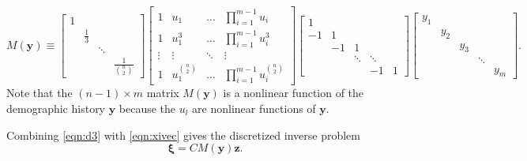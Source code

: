 \documentclass[11pt]{article}
\begin{document}
\begin{equation}
\label{eqn:M}
M(\boldsymbol y) \equiv
\begin{bmatrix}
1 &             &        &                       \\
  & \frac{1}{3} &        &                       \\
  &             & \ddots &                       \\
  &             &        & \frac{1}{\binom{n}{2}}
\end{bmatrix}
\begin{bmatrix}
1       & u_1                & \hdots & \prod_{i=1}^{m-1}u_i               \\
1       & u_1^3              & \hdots & \prod_{i=1}^{m-1}u_i^3             \\
\vdots  & \vdots             & \ddots & \vdots                                \\
1       & u_1^{\binom{n}{2}} & \hdots & \prod_{i=1}^{m-1}u_i^{\binom{n}{2}}
\end{bmatrix}
\begin{bmatrix}
1  &      &        &             &       \\
-1 & 1  &        &             &       \\
     & -1 & 1    &             &       \\
     &      & \ddots & \ddots      &       \\
     &      &        & -1 & 1
\end{bmatrix}
\begin{bmatrix}
y_1 &     &      &             &       \\
    & y_2 &      &             &       \\
     &     & y_3 &             &       \\
     &      &    & \ddots      &       \\
     &      &        &  & y_m
\end{bmatrix}.
\end{equation}
Note that the $(n-1)\times m$ matrix $M(\boldsymbol y)$ is a nonlinear function of the demographic history $\boldsymbol y$ because the $u_l$ are nonlinear functions of $\boldsymbol y$.

Combining \ref{eqn:d3} with \ref{eqn:xivec} gives the discretized inverse problem
\begin{equation}
\label{eqn:xivec2}
\boldsymbol\xi = C M(\boldsymbol y) \boldsymbol z.
\end{equation}
\end{document}
